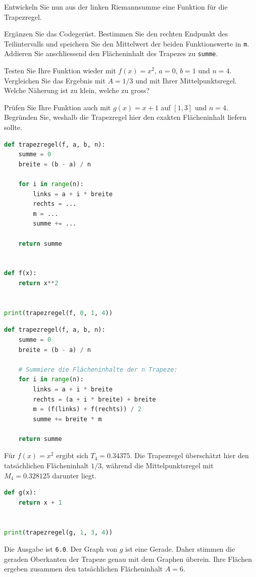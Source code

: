 \begin{myexercise}\label{ex:quadratur-trapezregel}
Entwickeln Sie nun aus der linken Riemannsumme eine Funktion für die Trapezregel.
\begin{aenum}
    \item Ergänzen Sie das Codegerüst. Bestimmen Sie den rechten Endpunkt des Teilintervalls und speichern Sie den Mittelwert der beiden Funktionswerte in \lstinline|m|. Addieren Sie anschliessend den Flächeninhalt des Trapezes zu \lstinline|summe|.
    \item Testen Sie Ihre Funktion wieder mit $f(x)=x^2$, $a=0$, $b=1$ und $n=4$. Vergleichen Sie das Ergebnis mit $A=1/3$ und mit Ihrer Mittelpunktsregel. Welche Näherung ist zu klein, welche zu gross?
    \item Prüfen Sie Ihre Funktion auch mit $g(x)=x+1$ auf $[1,3]$ und $n=4$. Begründen Sie, weshalb die Trapezregel hier den exakten Flächeninhalt liefern sollte.
\end{aenum}

\begin{lstlisting}[language=Python, caption={Codegerüst zur Trapezregel}]
def trapezregel(f, a, b, n):
    summe = 0
    breite = (b - a) / n

    for i in range(n):
        links = a + i * breite
        rechts = ...
        m = ...
        summe += ...

    return summe


def f(x):
    return x**2


print(trapezregel(f, 0, 1, 4))
\end{lstlisting}

\begin{myanswer}
\begin{lstlisting}[language=Python, caption={Musterlösung zur Trapezregel}, label={lst:quadratur-trapez}]
def trapezregel(f, a, b, n):
    summe = 0
    breite = (b - a) / n

    # Summiere die Flächeninhalte der n Trapeze:
    for i in range(n):
        links = a + i * breite
        rechts = (a + i * breite) + breite
        m = (f(links) + f(rechts)) / 2
        summe += breite * m

    return summe
\end{lstlisting}

Für $f(x)=x^2$ ergibt sich $T_4=0.34375$. Die Trapezregel überschätzt hier den tatsächlichen Flächeninhalt $1/3$, während die Mittelpunktsregel mit $M_4=0.328125$ darunter liegt.

\begin{lstlisting}[language=Python]
def g(x):
    return x + 1


print(trapezregel(g, 1, 3, 4))
\end{lstlisting}
Die Ausgabe ist \lstinline|6.0|. Der Graph von $g$ ist eine Gerade. Daher stimmen die geraden Oberkanten der Trapeze genau mit dem Graphen überein. Ihre Flächen ergeben zusammen den tatsächlichen Flächeninhalt $A=6$.
\end{myanswer}
\end{myexercise}

